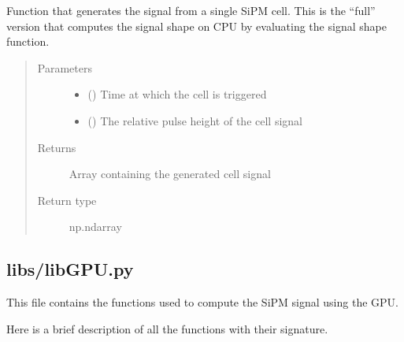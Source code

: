 \documentclass[letterpaper,10pt,english]{sphinxmanual}
\begin{document}

\begin{fulllineitems}
\label{\detokenize{structure:libs.libCPU.PulseCPU}}
Function that generates the signal from a single SiPM cell. This is the “full” version that computes the signal shape on CPU by evaluating the signal shape function.
\begin{quote}\begin{description}
\item[{Parameters}] \leavevmode\begin{itemize}
\item {} 
 () \textendash{} Time at which the cell is triggered

\item {} 
 () \textendash{} The relative pulse height of the cell signal

\end{itemize}

\item[{Returns}] \leavevmode
{} \textendash{} Array containing the generated cell signal

\item[{Return type}] \leavevmode
np.ndarray

\end{description}\end{quote}

\end{fulllineitems}



\subsection{libs/libGPU.py}
\label{\detokenize{structure:libs-libgpu-py}}
\begin{DUlineblock}{0em}
\item[] This file contains the functions used to compute the SiPM signal using the GPU.
\item[] Here is a brief description of all the functions with their signature.
\end{DUlineblock}
\end{document}
